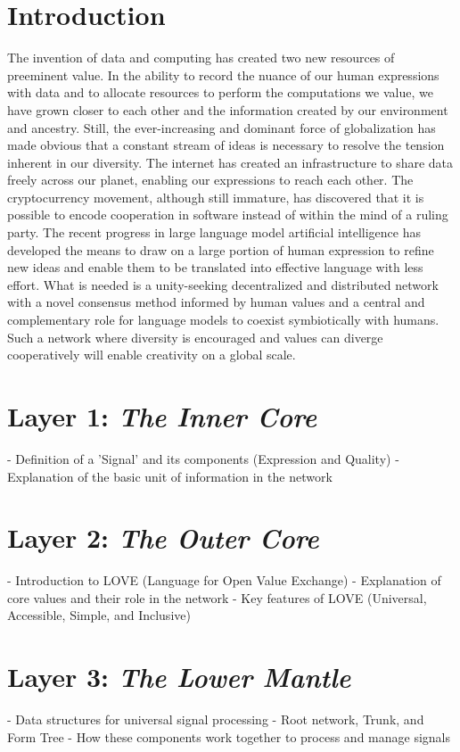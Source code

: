\documentclass{article}
\begin{document}
\section{Introduction}
The invention of data and computing has created two new resources of preeminent value. In the ability to record the nuance of our human expressions with data and to allocate resources to perform the computations we value, we have grown closer to each other and the information created by our environment and ancestry. Still, the ever-increasing and dominant force of globalization has made obvious that a constant stream of ideas is necessary to resolve the tension inherent in our diversity. The internet has created an infrastructure to share data freely across our planet, enabling our expressions to reach each other. The cryptocurrency movement, although still immature, has discovered that it is possible to encode cooperation in software instead of within the mind of a ruling party. The recent progress in large language model artificial intelligence has developed the means to draw on a large portion of human expression to refine new ideas and enable them to be translated into effective language with less effort. What is needed is a unity-seeking decentralized and distributed network with a novel consensus method informed by human values and a central and complementary role for language models to coexist symbiotically with humans. Such a network where diversity is encouraged and values can diverge cooperatively will enable creativity on a global scale.


\section{Layer 1: \textit{The Inner Core}}
- Definition of a 'Signal' and its components (Expression and Quality)
- Explanation of the basic unit of information in the network

\section{Layer 2: \textit{The Outer Core}}
- Introduction to LOVE (Language for Open Value Exchange)
- Explanation of core values and their role in the network
- Key features of LOVE (Universal, Accessible, Simple, and Inclusive)

\section{Layer 3: \textit{The Lower Mantle}}
- Data structures for universal signal processing
- Root network, Trunk, and Form Tree
- How these components work together to process and manage signals
\end{document}
